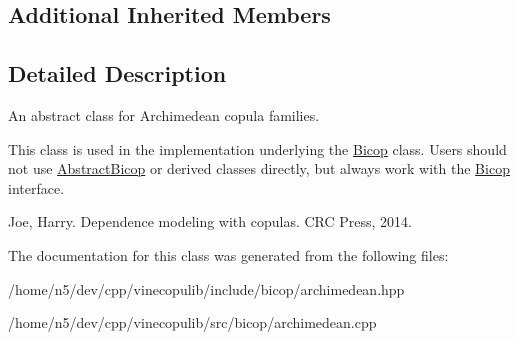 \subsection*{Additional Inherited Members}


\subsection{Detailed Description}
An abstract class for Archimedean copula families. 

This class is used in the implementation underlying the \hyperlink{classvinecopulib_1_1_bicop}{Bicop} class. Users should not use \hyperlink{classvinecopulib_1_1_abstract_bicop}{Abstract\+Bicop} or derived classes directly, but always work with the \hyperlink{classvinecopulib_1_1_bicop}{Bicop} interface.

Joe, Harry. Dependence modeling with copulas. C\+RC Press, 2014. 

The documentation for this class was generated from the following files\+:\begin{DoxyCompactItemize}
\item 
/home/n5/dev/cpp/vinecopulib/include/bicop/archimedean.\+hpp\item 
/home/n5/dev/cpp/vinecopulib/src/bicop/archimedean.\+cpp\end{DoxyCompactItemize}
